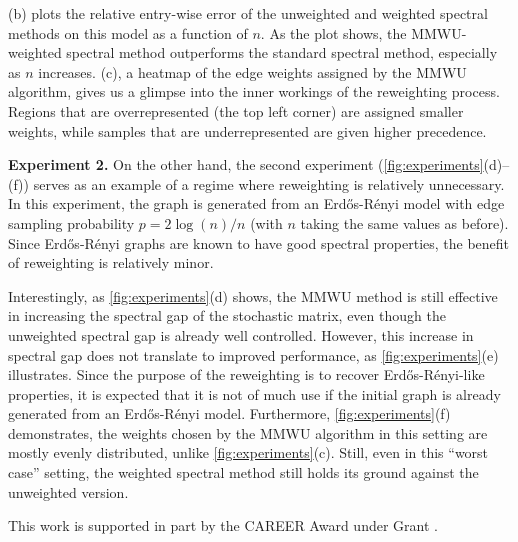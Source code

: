 \documentclass[sigconf,nonacm,pbalance]{acmart}
\begin{document}
(b) plots the relative entry-wise error of the unweighted and weighted spectral methods on this model as a function of $n$. As the plot shows, the MMWU-weighted spectral method outperforms the standard spectral method, especially as $n$ increases. (c), a heatmap of the edge weights assigned by the MMWU algorithm, gives us a glimpse into the inner workings of the reweighting process. Regions that are overrepresented (the top left corner) are assigned smaller weights, while samples that are underrepresented are given higher precedence.

\textbf{Experiment 2.} On the other hand, the second experiment (\cref{fig:experiments}(d)--(f)) serves as an example of a regime where reweighting is relatively unnecessary. In this experiment, the graph is generated from an Erd\H{o}s-R\'{e}nyi model with edge sampling probability $p=2\log(n)/n$ (with $n$ taking the same values as before). Since Erd\H{o}s-R\'{e}nyi graphs are known to have good spectral properties, the benefit of reweighting is relatively minor.

Interestingly, as \cref{fig:experiments}(d) shows, the MMWU method is still effective in increasing the spectral gap of the stochastic matrix, even though the unweighted spectral gap is already well controlled. However, this increase in spectral gap does not translate to improved performance, as \cref{fig:experiments}(e) illustrates. Since the purpose of the reweighting is to recover Erd\H{o}s-R\'{e}nyi-like properties, it is expected that it is not of much use if the initial graph is already generated from an Erd\H{o}s-R\'{e}nyi model. Furthermore, \cref{fig:experiments}(f) demonstrates, the weights chosen by the MMWU algorithm in this setting are mostly evenly distributed, unlike \cref{fig:experiments}(c). Still, even in this ``worst case'' setting, the weighted spectral method still holds its ground against the unweighted version.



\begin{acks}
This work is supported in part by the  CAREER Award under Grant .
\end{acks}





\appendix

\newcommand{\whprel}[2]{\stackrel[\mathclap{#1}]{}{\boxed{#2}}}
\newcommand{\awhprel}[2]{\!\!\whprel{#1}{#2}}
\end{document}
